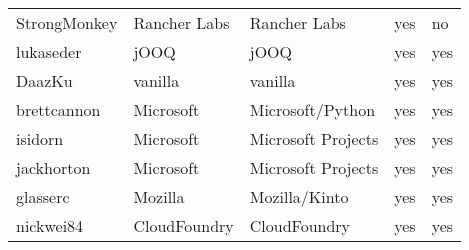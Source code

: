 \begin{landscape}
\begin{table}[]
\begin{tabular}{lllll}
            StrongMonkey  & Rancher Labs & Rancher Labs                 & yes          & no                     \\
            lukaseder     & jOOQ         & jOOQ                         & yes          & yes                    \\
            DaazKu        & vanilla      & vanilla                      & yes          & yes                    \\
            brettcannon   & Microsoft    & Microsoft/Python             & yes          & yes                    \\
            isidorn       & Microsoft    & Microsoft Projects           & yes          & yes                    \\
            jackhorton    & Microsoft    & Microsoft Projects           & yes          & yes                    \\
            glasserc      & Mozilla      & Mozilla/Kinto                & yes          & yes                    \\
            nickwei84     & CloudFoundry & CloudFoundry                 & yes          & yes
        \end{tabular}
    \end{table}
\end{landscape}
